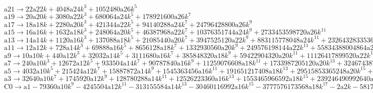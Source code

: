 \documentclass[12pt,a4paper,draft]{article}
\begin{document}
$\text{a21}\to 22 \text{a22} k+4048 \text{a24} k^3+1052480 \text{a26} k^5$\\
$\text{a19}\to 20 \text{a20} k+3080 \text{a22} k^3+680064 \text{a24} k^5+178921600 \text{a26} k^7$\\
$\text{a17}\to 18 \text{a18} k+2280 \text{a20} k^3+421344 \text{a22} k^5+94140288 \text{a24} k^7+24796428800 \text{a26} k^9$\\
$\text{a15}\to 16 \text{a16} k+1632 \text{a18} k^3+248064 \text{a20} k^5+46387968 \text{a22} k^7+10376351744 \text{a24} k^9+2733453598720 \text{a26} k^{11}$\\
$\text{a13}\to 14 \text{a14} k+1120 \text{a16} k^3+137088 \text{a18} k^5+21085440 \text{a20} k^7+3947525120 \text{a22} k^9+883115778048 \text{a24} k^{11}+232643283353600 \text{a26} k^{13}$\\
$\text{a11}\to 12 \text{a12} k+728 \text{a14} k^3+69888 \text{a16} k^5+8656128 \text{a18} k^7+1332930560 \text{a20} k^9+249576198144 \text{a22} k^{11}+55834388004864 \text{a24} k^{13}+14708733593681920 \text{a26} k^{15}$\\
$\text{a9}\to 10 \text{a10} k+440 \text{a12} k^3+32032 \text{a14} k^5+3111680 \text{a16} k^7+385848320 \text{a18} k^9+59422904320 \text{a20} k^{11}+11126417899520 \text{a22} k^{13}+2489170300469248 \text{a24} k^{15}+655734757395660800 \text{a26} k^{17}$\\
$\text{a7}\to 240 \text{a10} k^3+12672 \text{a12} k^5+933504 \text{a14} k^7+90787840 \text{a16} k^9+11259076608 \text{a18} k^{11}+1733987205120 \text{a20} k^{13}+324674387017728 \text{a22} k^{15}+72635234665365504 \text{a24} k^{17}+19134668627220889600 \text{a26} k^{19}+8 \text{a8} k$\\
$\text{a5}\to 4032 \text{a10} k^5+215424 \text{a12} k^7+15887872 \text{a14} k^9+1545363456 \text{a16} k^{11}+191651217408 \text{a18} k^{13}+29515853365248 \text{a20} k^{15}+5526593941929984 \text{a22} k^{17}+1236393972835811328 \text{a24} k^{19}+325709541934503034880 \text{a26} k^{21}+6 \text{a6} k+112 \text{a8} k^3$\\
$\text{a3}\to 32640 \text{a10} k^7+1745920 \text{a12} k^9+128780288 \text{a14} k^{11}+12526223360 \text{a16} k^{13}+1553465966592 \text{a18} k^{15}+239246490992640 \text{a20} k^{17}+44796883073761280 \text{a22} k^{19}+10021832059523170304 \text{a24} k^{21}+2640102104917816115200 \text{a26} k^{23}+4 \text{a4} k+40 \text{a6} k^3+896 \text{a8} k^5$\\
$\text{C0}\to \text{a1}-79360 \text{a10} k^9-4245504 \text{a12} k^{11}-313155584 \text{a14} k^{13}-30460116992 \text{a16} k^{15}-3777576173568 \text{a18} k^{17}-2 \text{a2} k-581777702256640 \text{a20} k^{19}-108932957168730112 \text{a22} k^{21}-24370173276164456448 \text{a24} k^{23}-6419958484945407574016 \text{a26} k^{25}-8 \text{a4} k^3-96 \text{a6} k^5-2176 \text{a8} k^7$\\
\end{document}
